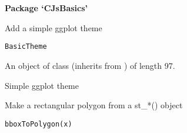 \documentclass[a4paper]{book}
\begin{document}
\chapter*{}
\begin{center}
{\textbf{\huge Package `CJsBasics'}}
\par\bigskip{\large \today}
\end{center}
\begin{description}
\raggedright{}
\item[Title]
\item[Version]
\item[Description]
\item[Depends]
\item[License]
\item[LazyData]
\item[Imports]
\item[RoxygenNote]
\end{description}
%
\begin{Description}\relax
Add a simple ggplot theme
\end{Description}
%
\begin{Usage}
\begin{verbatim}
BasicTheme
\end{verbatim}
\end{Usage}
%
\begin{Format}
An object of class  (inherits from ) of length 97.
\end{Format}
%
\begin{Value}
Simple ggplot theme
\end{Value}
%
\begin{Description}\relax
Make a rectangular polygon from a st\_*() object
\end{Description}
%
\begin{Usage}
\begin{verbatim}
bboxToPolygon(x)
\end{verbatim}
\end{Usage}
\end{document}
